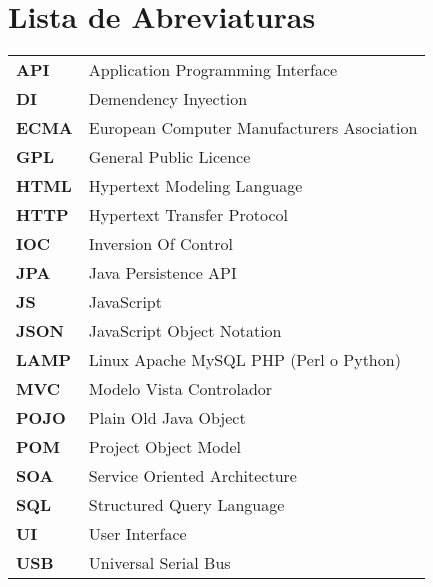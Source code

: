\chapter*{Lista de Abreviaturas}
\begin{table*}[h!]
    \begin{center}
        \begin{tabular}{ll}
            \textbf{API} & Application Programming Interface\\
            \textbf{DI} & Demendency Inyection\\
            \textbf{ECMA} & European Computer Manufacturers Asociation\\
            \textbf{GPL} & General Public Licence\\
            \textbf{HTML} & Hypertext Modeling Language\\
            \textbf{HTTP} & Hypertext Transfer Protocol\\
            \textbf{IOC} & Inversion Of Control\\
            \textbf{JPA} & Java Persistence API\\
            \textbf{JS} & JavaScript\\
            \textbf{JSON} & JavaScript Object Notation\\
            \textbf{LAMP} & Linux Apache MySQL PHP (Perl o Python)\\
            \textbf{MVC} & Modelo Vista Controlador\\
            \textbf{POJO} & Plain Old Java Object\\
            \textbf{POM} & Project Object Model\\
            \textbf{SOA} & Service Oriented Architecture\\
            \textbf{SQL} & Structured Query Language\\
            \textbf{UI} & User Interface\\
            \textbf{USB} & Universal Serial Bus\\
        \end{tabular}
    \end{center}
\end{table*}